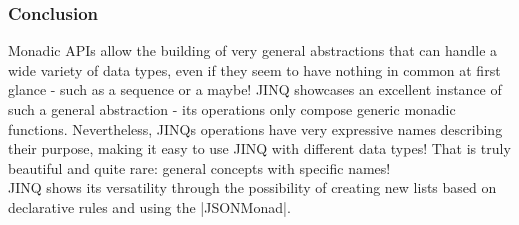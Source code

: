 \subsubsection{Conclusion} %
\label{subsub:JINQ_Conclusion}
Monadic APIs allow the building of very general abstractions that can handle a
wide variety of data types, even if they seem to have nothing in common at
first glance - such as a sequence or a maybe! JINQ showcases an excellent
instance of such a general abstraction - its operations only compose generic
monadic functions. Nevertheless, JINQs operations have very expressive names
describing their purpose, making it easy to use JINQ with different data types!
That is truly beautiful and quite rare: general concepts with specific
names!\\ 
JINQ shows its versatility through the possibility of creating new lists based
on declarative rules and using the |JSONMonad|.
